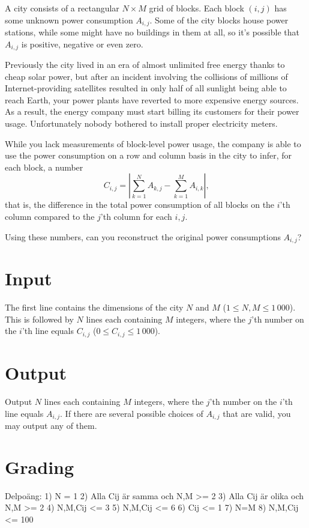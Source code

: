 A city consists of a rectangular $N \times M$ grid of blocks.
Each block $(i, j)$ has some unknown power consumption $A_{i, j}$.
Some of the city blocks house power stations, while some might have no buildings in them at all, so it's possible that $A_{i, j}$ is positive, negative or even zero.

Previously the city lived in an era of almost unlimited free energy thanks to cheap solar power, but after an incident involving the collisions of millions of Internet-providing satellites resulted in only half of all sunlight being able to reach Earth, your power plants have reverted to more expensive energy sources.
As a result, the energy company must start billing its customers for their power usage.
Unfortunately nobody bothered to install proper electricity meters.

While you lack measurements of block-level power usage, the company is able to use the power consumption on a row and column basis in the city to infer, for each block, a number
$$C_{i, j} = \left| \sum_{k=1}^N A_{k, j} - \sum_{k=1}^M A_{i, k} \right| \text{,}$$
that is, the difference in the total power consumption of all blocks on the $i$'th column compared to the $j$'th column for each $i, j$.

Using these numbers, can you reconstruct the original power consumptions $A_{i, j}$?

\section*{Input}
The first line contains the dimensions of the city $N$ and $M$ ($1 \le N, M \le 1\,000$).
This is followed by $N$ lines each containing $M$ integers, where the $j$'th number on the $i$'th line equals $C_{i, j}$ ($0 \le C_{i, j} \le 1\,000$).

\section*{Output}
Output $N$ lines each containing $M$ integers, where the $j$'th number on the $i$'th line equals $A_{i, j}$.
If there are several possible choices of $A_{i, j}$ that are valid, you may output any of them.

\section*{Grading}
Delpoäng:
1) N = 1
2) Alla Cij är samma och N,M >= 2
3) Alla Cij är olika och N,M >= 2
4) N,M,Cij <= 3
5) N,M,Cij <= 6
6) Cij <= 1
7) N=M
8) N,M,Cij <= 100

